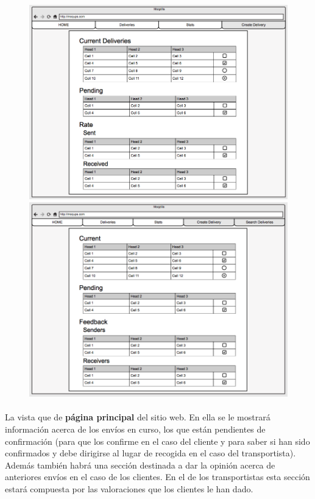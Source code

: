 \documentclass[10pt, a4paper,spanish]{article}
\begin{document}
			\begin{figure}[H]
				\centering
				\begin{minipage}[b]{0.49\textwidth}
					\includegraphics[width=\textwidth]{res/sketch_home.png}

				\end{minipage}
				\begin{minipage}[b]{0.49\textwidth}
					\includegraphics[width=\textwidth]{res/sketch_home_carrier.png}

				\end{minipage}
			\end{figure}

			\paragraph{}
			La vista que de \textbf{página principal} del sitio web. En ella se le mostrará información acerca de los envíos en curso, los que están pendientes de confirmación (para que los confirme en el caso del cliente y para saber si han sido confirmados y debe dirigirse al lugar de recogida en el caso del transportista). Además también habrá una sección destinada a dar la opinión acerca de anteriores envíos en el caso de los clientes. En el de los transportistas esta sección estará compuesta por las valoraciones que los clientes le han dado.
\end{document}
